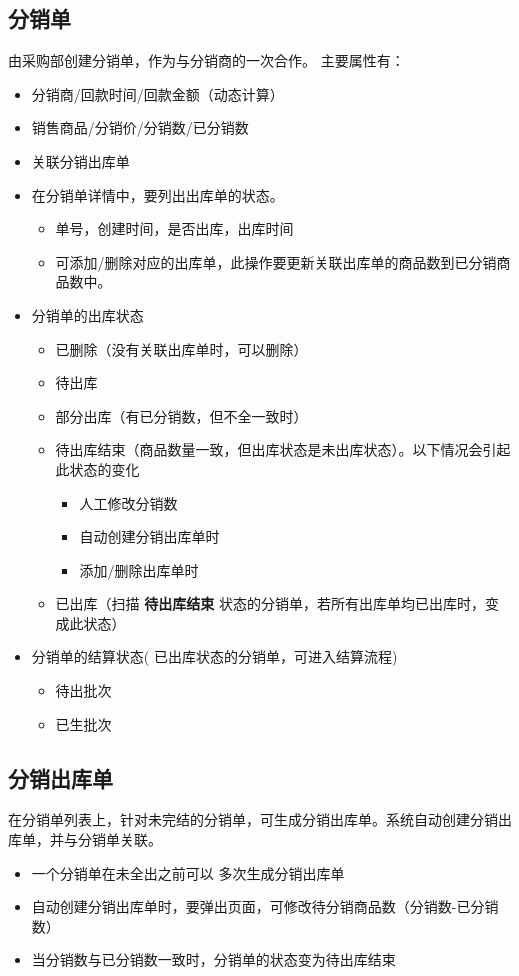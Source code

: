 \documentclass[11pt]{article}
\begin{document}
\subsection{分销单}
\label{sec:orgeda641c}
由采购部创建分销单，作为与分销商的一次合作。
主要属性有：
\begin{itemize}
\item 分销商/回款时间/回款金额（动态计算）
\item 销售商品/分销价/分销数/已分销数
\item 关联分销出库单
\item 在分销单详情中，要列出出库单的状态。
\begin{itemize}
\item 单号，创建时间，是否出库，出库时间
\item 可添加/删除对应的出库单，此操作要更新关联出库单的商品数到已分销商品数中。
\end{itemize}
\item 分销单的出库状态
\begin{itemize}
\item 已删除（没有关联出库单时，可以删除）
\item 待出库
\item 部分出库（有已分销数，但不全一致时）
\item 待出库结束（商品数量一致，但出库状态是未出库状态）。以下情况会引起此状态的变化
\begin{itemize}
\item 人工修改分销数
\item 自动创建分销出库单时
\item 添加/删除出库单时
\end{itemize}
\item 已出库（扫描 \textbf{待出库结束} 状态的分销单，若所有出库单均已出库时，变成此状态）
\end{itemize}
\item 分销单的结算状态( 已出库状态的分销单，可进入结算流程)
\begin{itemize}
\item 待出批次
\item 已生批次
\end{itemize}
\end{itemize}

\subsection{分销出库单}
\label{sec:org0e3e50d}
在分销单列表上，针对未完结的分销单，可生成分销出库单。系统自动创建分销出库单，并与分销单关联。\\
\begin{itemize}
\item 一个分销单在未全出之前可以 多次生成分销出库单
\item 自动创建分销出库单时，要弹出页面，可修改待分销商品数（分销数-已分销数）
\item 当分销数与已分销数一致时，分销单的状态变为待出库结束
\end{itemize}
\end{document}

